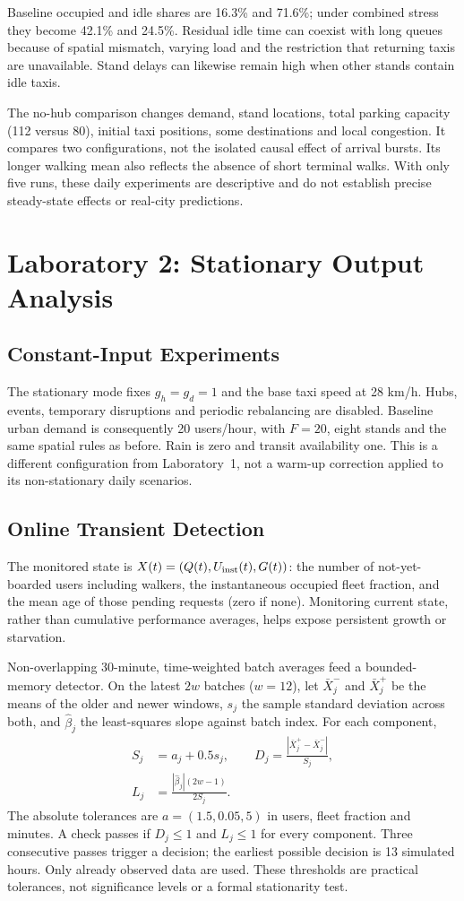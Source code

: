 \documentclass[10pt,twocolumn,letterpaper]{article}
\begin{document}
Baseline occupied and idle shares are 16.3\% and 71.6\%; under combined stress
they become 42.1\% and 24.5\%. Residual idle time can coexist with long queues
because of spatial mismatch, varying load and the restriction that returning
taxis are unavailable. Stand delays can likewise remain high when other
stands contain idle taxis.

The no-hub comparison changes demand, stand locations, total parking capacity
(112 versus 80), initial taxi positions, some destinations and local congestion.
It compares two configurations, not the isolated causal effect of arrival
bursts. Its longer walking mean also reflects the absence of short terminal
walks. With only five runs, these daily experiments are descriptive and do not
establish precise steady-state effects or real-city predictions.

\section{Laboratory 2: Stationary Output Analysis}
\subsection{Constant-Input Experiments}
The stationary mode fixes $g_h=g_d=1$ and the base taxi speed at 28 km/h.
Hubs, events, temporary disruptions and periodic rebalancing are disabled.
Baseline urban demand is consequently 20 users/hour, with $F=20$, eight stands
and the same spatial rules as before. Rain is zero and transit availability one.
This is a different configuration from Laboratory~1, not a warm-up correction
applied to its non-stationary daily scenarios.

\subsection{Online Transient Detection}
The monitored state is $X(t)=(Q(t),U_{\rm inst}(t),G(t))$: the number of
not-yet-boarded users including walkers, the instantaneous occupied fleet
fraction, and the mean age of those pending requests (zero if none).
Monitoring current state, rather than cumulative performance averages, helps
expose persistent growth or starvation.

Non-overlapping 30-minute, time-weighted batch averages feed a bounded-memory
detector. On the latest $2w$ batches ($w=12$), let $\bar X_j^-$ and $\bar X_j^+$
be the means of the older and newer windows, $s_j$ the sample standard
deviation across both, and $\hat\beta_j$ the least-squares slope against batch
index. For each component,
\begin{align}
 S_j&=a_j+0.5s_j,\qquad
 D_j=\frac{|\bar X_j^+-\bar X_j^-|}{S_j},\label{eq:detector}\\
 L_j&=\frac{|\hat\beta_j|(2w-1)}{2S_j}.\label{eq:drift}
\end{align}
The absolute tolerances are $a=(1.5,0.05,5)$ in users, fleet fraction and
minutes. A check passes if $D_j\leq1$ and $L_j\leq1$ for every component.
Three consecutive passes trigger a decision; the earliest possible decision
is 13 simulated hours. Only already observed data are used. These thresholds
are practical tolerances, not significance levels or a formal stationarity test.
\end{document}

